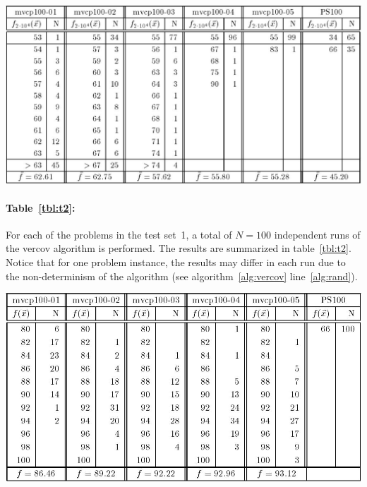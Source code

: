 \documentclass[12pt]{article}
\begin{document}
\begin{table}[!htbp]
\centering
\includegraphics[width=1\textwidth]{t1}
\caption[Results obtained by GA for graphs in test set~1]{%
Experimental results obtained by the genetic algorithm for five random graphs of size $n = 100$ with edge density: $d = 0.1$ (``mvcp100-01''), $d = 0.2$ (``mvcp100-02''), $d = 0.3$ (``mvcp100-03''), $d = 0.5$ (``mvcp100-04''), $d = 0.5$ (``mvcp100-05'') and the regular graph of size $n = 100 \ (k=32)$ from Papadimitriou and Steiglitz (``PS100'').%
}
\label{tbl:t1}
\end{table}

\paragraph{Table~\ref{tbl:t2}:}
For each of the problems in the test set~1, a total of $N=100$
independent runs of the vercov algorithm is performed.
The results are summarized in table~\ref{tbl:t2}.
Notice that for one problem instance, the results may differ in each run due to the
non-determinism of the algorithm (see algorithm~\ref{alg:vercov} line~\ref{alg:rand}).

\begin{table}[!htbp]
\centering
\includegraphics[width=1\textwidth]{t2}
\caption[Results obtained by vercov algorithm for graphs in test set~1]{%
Experimental results obtained by the vercov algorithm for five random graphs of size $n = 100$ with edge density: $d = 0.1$ (``mvcp100-01''), $d = 0.2$ (``mvcp100-02''), $d = 0.3$ (``mvcp100-03''), $d = 0.5$ (``mvcp100-04''), $d = 0.5$ (``mvcp100-05'') and the regular graph of size $n = 100 \ (k=32)$ from Papadimitriou and Steiglitz (``PS100'').%
}
\label{tbl:t2}
\end{table}
\end{document}
